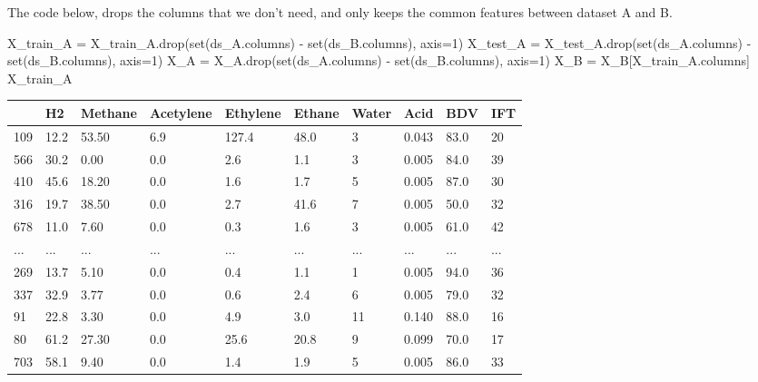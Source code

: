\documentclass[
  letterpaper,
  DIV=11,
  numbers=noendperiod]{scrartcl}
\newenvironment{Shaded}{\begin{snugshade}}{\end{snugshade}}
\newcommand{\BuiltInTok}[1]{\textcolor[rgb]{0.00,0.23,0.31}{#1}}
\newcommand{\DecValTok}[1]{\textcolor[rgb]{0.68,0.00,0.00}{#1}}
\newcommand{\NormalTok}[1]{\textcolor[rgb]{0.00,0.23,0.31}{#1}}
\newcommand{\OperatorTok}[1]{\textcolor[rgb]{0.37,0.37,0.37}{#1}}
\begin{document}
The code below, drops the columns that we don't need, and only keeps the
common features between dataset A and B.

\begin{Shaded}
\begin{Highlighting}[]
\NormalTok{X\_train\_A }\OperatorTok{=}\NormalTok{ X\_train\_A.drop(}\BuiltInTok{set}\NormalTok{(ds\_A.columns) }\OperatorTok{{-}} \BuiltInTok{set}\NormalTok{(ds\_B.columns), axis}\OperatorTok{=}\DecValTok{1}\NormalTok{)}
\NormalTok{X\_test\_A }\OperatorTok{=}\NormalTok{ X\_test\_A.drop(}\BuiltInTok{set}\NormalTok{(ds\_A.columns) }\OperatorTok{{-}} \BuiltInTok{set}\NormalTok{(ds\_B.columns), axis}\OperatorTok{=}\DecValTok{1}\NormalTok{)}
\NormalTok{X\_A }\OperatorTok{=}\NormalTok{ X\_A.drop(}\BuiltInTok{set}\NormalTok{(ds\_A.columns) }\OperatorTok{{-}} \BuiltInTok{set}\NormalTok{(ds\_B.columns), axis}\OperatorTok{=}\DecValTok{1}\NormalTok{)}
\NormalTok{X\_B }\OperatorTok{=}\NormalTok{ X\_B[X\_train\_A.columns]}
\NormalTok{X\_train\_A}
\end{Highlighting}
\end{Shaded}

\begin{longtable}[]{@{}llllllllll@{}}
\toprule()
& H2 & Methane & Acetylene & Ethylene & Ethane & Water & Acid & BDV &
IFT \\
\midrule()
\endhead
109 & 12.2 & 53.50 & 6.9 & 127.4 & 48.0 & 3 & 0.043 & 83.0 & 20 \\
566 & 30.2 & 0.00 & 0.0 & 2.6 & 1.1 & 3 & 0.005 & 84.0 & 39 \\
410 & 45.6 & 18.20 & 0.0 & 1.6 & 1.7 & 5 & 0.005 & 87.0 & 30 \\
316 & 19.7 & 38.50 & 0.0 & 2.7 & 41.6 & 7 & 0.005 & 50.0 & 32 \\
678 & 11.0 & 7.60 & 0.0 & 0.3 & 1.6 & 3 & 0.005 & 61.0 & 42 \\
... & ... & ... & ... & ... & ... & ... & ... & ... & ... \\
269 & 13.7 & 5.10 & 0.0 & 0.4 & 1.1 & 1 & 0.005 & 94.0 & 36 \\
337 & 32.9 & 3.77 & 0.0 & 0.6 & 2.4 & 6 & 0.005 & 79.0 & 32 \\
91 & 22.8 & 3.30 & 0.0 & 4.9 & 3.0 & 11 & 0.140 & 88.0 & 16 \\
80 & 61.2 & 27.30 & 0.0 & 25.6 & 20.8 & 9 & 0.099 & 70.0 & 17 \\
703 & 58.1 & 9.40 & 0.0 & 1.4 & 1.9 & 5 & 0.005 & 86.0 & 33 \\
\bottomrule()
\end{longtable}
\end{document}

